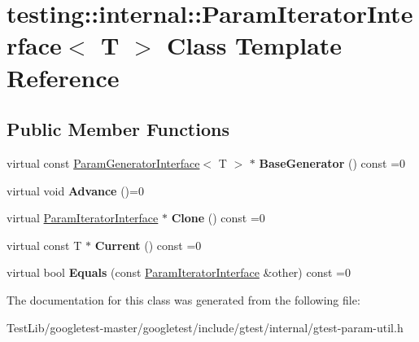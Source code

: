 \hypertarget{classtesting_1_1internal_1_1ParamIteratorInterface}{}\section{testing\+:\+:internal\+:\+:Param\+Iterator\+Interface$<$ T $>$ Class Template Reference}
\label{classtesting_1_1internal_1_1ParamIteratorInterface}
\subsection*{Public Member Functions}
\begin{DoxyCompactItemize}
\item 
\mbox{\label{classtesting_1_1internal_1_1ParamIteratorInterface_a17500953df75ecda1ace46c08ff731e9}} 
virtual const \hyperlink{classtesting_1_1internal_1_1ParamGeneratorInterface}{Param\+Generator\+Interface}$<$ T $>$ $\ast$ {\bfseries Base\+Generator} () const =0
\item 
\mbox{\label{classtesting_1_1internal_1_1ParamIteratorInterface_a600dbd35fcb551463e379516a1abea48}} 
virtual void {\bfseries Advance} ()=0
\item 
\mbox{\label{classtesting_1_1internal_1_1ParamIteratorInterface_a4998c23e27e2943d97546011aa35db80}} 
virtual \hyperlink{classtesting_1_1internal_1_1ParamIteratorInterface}{Param\+Iterator\+Interface} $\ast$ {\bfseries Clone} () const =0
\item 
\mbox{\label{classtesting_1_1internal_1_1ParamIteratorInterface_adfff808576d929085679c315b255af7e}} 
virtual const T $\ast$ {\bfseries Current} () const =0
\item 
\mbox{\label{classtesting_1_1internal_1_1ParamIteratorInterface_a9d811697a752d46f7bd6a0082f9040a3}} 
virtual bool {\bfseries Equals} (const \hyperlink{classtesting_1_1internal_1_1ParamIteratorInterface}{Param\+Iterator\+Interface} \&other) const =0
\end{DoxyCompactItemize}


The documentation for this class was generated from the following file\+:\begin{DoxyCompactItemize}
\item 
Test\+Lib/googletest-\/master/googletest/include/gtest/internal/gtest-\/param-\/util.\+h\end{DoxyCompactItemize}

